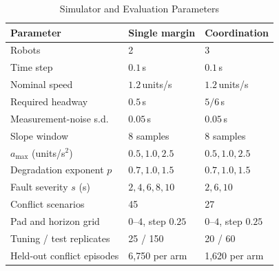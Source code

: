 \begin{table}[htbp]
  \centering
  \caption{Simulator and Evaluation Parameters}
  \label{tab:parameters}
  \footnotesize
  \setlength{\tabcolsep}{4pt}
  \begin{tabular}{@{}lll@{}}
    \toprule
    Parameter & Single margin & Coordination \\
    \midrule
    Robots & 2 & 3 \\
    Time step & $0.1$\,s & $0.1$\,s \\
    Nominal speed & $1.2$\,units/s & $1.2$\,units/s \\
    Required headway & $0.5$\,s & $5/6$\,s \\
    Measurement-noise s.d. & $0.05$\,s & $0.05$\,s \\
    Slope window & 8 samples & 8 samples \\
    $a_{\max}$ (units/s$^2$) & $0.5,1.0,2.5$ & $0.5,1.0,2.5$ \\
    Degradation exponent $p$ & $0.7,1.0,1.5$ & $0.7,1.0,1.5$ \\
    Fault severity $s$ (s) & $2,4,6,8,10$ & $2,6,10$ \\
    Conflict scenarios & 45 & 27 \\
    Pad and horizon grid & $0$--$4$, step $0.25$ & $0$--$4$, step $0.25$ \\
    Tuning / test replicates & 25 / 150 & 20 / 60 \\
    Held-out conflict episodes & 6,750 per arm & 1,620 per arm \\
    \bottomrule
  \end{tabular}
\end{table}
